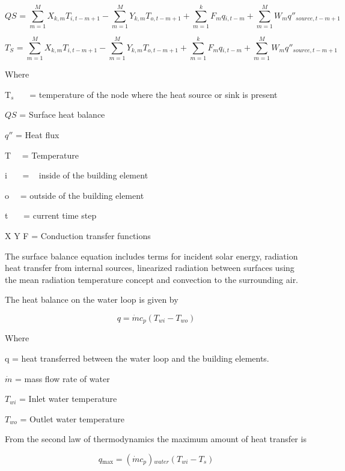 \begin{equation}
QS{}_{} = \sum\limits_{m = 1}^M {X{}_{k,m}} T{}_{i,t - m + 1} - \sum\limits_{m = 1}^M {Y{}_{k,m}} T{}_{o,t - m + 1} + \sum\limits_{m = 1}^k {F{}_m} q{}_{i,t - m} + \sum\limits_{m = 1}^M {W{}_m} {q''}{}_{source,t - m + 1}
\end{equation}

\begin{equation}
T{}_S{}_{} = \sum\limits_{m = 1}^M {X{}_{k,m}} T{}_{i,t - m + 1} - \sum\limits_{m = 1}^M {Y{}_{k,m}} T{}_{o,t - m + 1} + \sum\limits_{m = 1}^k {F{}_m} q{}_{i,t - m} + \sum\limits_{m = 1}^M {W{}_m} q''{}_{source,t - m + 1}
\end{equation}

Where

T\(_{s}\)~~~ = temperature of the node where the heat source or sink is present

\(QS\) = Surface heat balance

\({q''}\) = Heat flux

T~~ = Temperature

i~~~ = ~ inside of the building element

o~~ = outside of the building element

t~~~ = current time step

X Y F = Conduction transfer functions

The surface balance equation includes terms for incident solar energy, radiation heat transfer from internal sources, linearized radiation between surfaces using the mean radiation temperature concept and convection to the surrounding air.

The heat balance on the water loop is given by

\begin{equation}
q = \dot mc{}_p(T{}_{wi} - T{}_{wo})
\end{equation}

Where

q = heat transferred between the water loop and the building elements.

\(\dot m\) = mass flow rate of water

\(T{}_{wi}\) = Inlet water temperature

\(T{}_{wo}\) = Outlet water temperature

From the second law of thermodynamics the maximum amount of heat transfer is

\begin{equation}
q{}_{\max } = (\dot mc{}_p){}_{water}(T{}_{wi} - T{}_s)
\end{equation}


